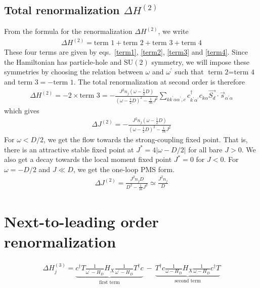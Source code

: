 \documentclass{revtex4-2}
\numberwithin{equation}{section}
\begin{document}
\subsection{Total renormalization \(\Delta H^{(2)}\)}
From the formula for the renormalization \(\Delta H^{(2)}\), we write
\begin{equation}\begin{aligned}
	\Delta H^{(2)} = \text{term 1} + \text{term 2} + \text{term 3} + \text{term 4}
\end{aligned}\end{equation}
These four terms are given by eqs.~\ref{term1}, \ref{term2}, \ref{term3} and \ref{term4}. Since the Hamiltonian has particle-hole and \(\mathrm{SU}(2)\) symmetry, we will impose these symmetries by choosing the relation between \(\omega\) and \(\omega^\prime\) such that \(\text{term 2} = \text{term 4}\) and \( \text{term 3} = -\text{term 1}\). The total renormalization at second order is therefore
\begin{equation}\begin{aligned}
	\Delta H^{(2)} = -2 \times \text{term 3} = -\frac{J^2 n_j \left(\omega - \frac{1}{2}D\right)}{\left(\omega - \frac{1}{2}D\right)^2 - \frac{1}{16}J^2} \sum_{k k^\prime \alpha \alpha^\prime,c} c^\dagger_{k^\prime\alpha^\prime} c_{k\alpha} \vec{S_d}\cdot\vec{s}_{\alpha^\prime \alpha}
\end{aligned}\end{equation}
which gives
\begin{equation}\begin{aligned}
	\Delta J^{(2)} = -\frac{J^2 n_j \left(\omega - \frac{1}{2}D\right)}{\left(\omega - \frac{1}{2}D\right)^2 - \frac{1}{16}J^2}
\end{aligned}\end{equation}
For \(\omega < D/2\), we get the flow towards the strong-coupling fixed point. That is, there is an attractive stable fixed point at \(J^* = 4|\omega - D/2|\) for all bare \(J > 0\). We also get a decay towards the local moment fixed point \(J^* = 0\) for \(J < 0\). For \(\omega = -D/2\) and \(J \ll D\), we get the one-loop PMS form. 
\begin{equation}\begin{aligned}
	\Delta J^{(2)} = \frac{J^2 n_j D}{D^2 - \frac{1}{16}J^2} \simeq \frac{J^2 n_j }{D}
\end{aligned}\end{equation}
\section{Next-to-leading order renormalization}
\begin{equation}\begin{aligned}
	\Delta H^{(3)}_j = \underbrace{c^\dagger T \frac{1}{\omega^\prime - H_D} H_X \frac{1}{\omega^\prime - H_D} T^\dagger c}_\text{first term} ~-~ \underbrace{T^\dagger c \frac{1}{\omega - H_D} H_X \frac{1}{\omega - H_D} c^\dagger T}_\text{second term}
\end{aligned}\end{equation}
\end{document}
